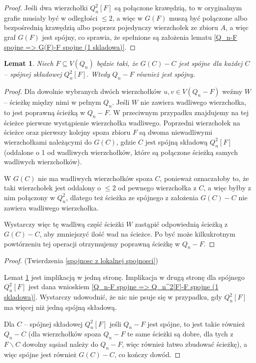 \documentclass{pracamgr}
\newtheorem{lemma}[theorem]{Lemat}
\begin{document}
    \begin{proof}
     Jeśli dwa wierzchołki $Q_n^2[F]$ są połączone krawędzią, to w oryginalnym grafie musiały być w odległości $\le 2$, a więc w $G(F)$ muszą być połączone
     albo bezpośrednią krawędzią albo poprzez pojedynczy wierzchołek ze zbioru $A$, a więc graf $G(F)$ jest spójny, co sprawia,
     że spełnione są założenia lematu \ref{Q_n-F spojne => G(F)-F spojne (1 skladowa)}.
    \end{proof}
    \begin{lemma}\label{Q_n^2[F]-F spojne => Q_n-F spojne}
     Niech $F\subseteq V(Q_n)$ będzie taki, że $G(C)-C$ jest spójne dla każdej $C$ -- spójnej składowej $Q_n^2[F]$. Wtedy $Q_n-F$ również jest spójny.
    \end{lemma}
    \begin{proof}
     Dla dowolnie wybranych dwóch wierzchołków $u,v\in V(Q_n-F)$ weźmy $W$ -- ścieżkę między nimi w pełnym $Q_n$. Jeśli $W$ nie zawiera wadliwego wierzchołka,
     to jest poprawną ścieżką w $Q_n-F$. W przeciwnym przypadku znajdujemy na tej ścieżce pierwsze wystąpienie wierzchołka wadliwego.
     Poprzedni wierzchołek na ścieżce oraz pierwszy kolejny spoza zbioru $F$ są dwoma niewadliwymi wierzchołkami należącymi do $G(C)$, gdzie $C$
     jest spójną składową $Q_n^2[F]$ (oddalone o 1 od wadliwych wierzchołków, które są połączone ścieżką samych wadliwych wierzchołków).
     
     W $G(C)$ nie ma wadliwych wierzchołków spoza $C$, ponieważ oznaczałoby to, że taki wierzchołek jest oddalony o $\le 2$ od pewnego wierzchołka z $C$,
     a więc byłby z nim połączony w $Q_n^2$, dlatego też ścieżka ze spójnego z założenia $G(C)-C$ nie zawiera wadliwego wierzchołka.
     
     Wystarczy więc tę wadliwą część ścieżki $W$ zastąpić odpowiednią ścieżką z $G(C)-C$, aby zmniejszyć ilość wad na ścieżce.
     Po być może kilkukrotnym powtórzeniu tej operacji otrzymujemy poprawną ścieżkę w $Q_n-F$.
    \end{proof}\newpage
    \begin{proof}
     (Twierdzenia \ref{spojnosc z lokalnej spojnosci})
     
     Lemat \ref{Q_n^2[F]-F spojne => Q_n-F spojne} jest implikacją w jedną stronę.
     Implikacja w drugą stronę dla spójnego $Q_n^2[F]$ jest dana wnioskiem \ref{Q_n-F spojne => Q_n^2[F]-F spojne (1 skladowa)}.
     Wystarczy udowodnić, że nic nie psuje się w przypadku, gdy $Q_n^2[F]$ ma więcej niż jedną spójną składową.
     
     Dla $C$ -- spójnej składowej $Q_n^2[F]$ jeśli $Q_n-F$ jest spójne, to jest takie również $Q_n-C$
     (dla wierzchołków spoza $Q_n-F$ te same ścieżki są dobre, dla tych z  $F\backslash C$ dowolny sąsiad należy do $Q_n-F$, więc również łatwo zbudować ścieżkę),
     a więc spójne jest również $G(C)-C$, co kończy dowód.
    \end{proof}
\end{document}

